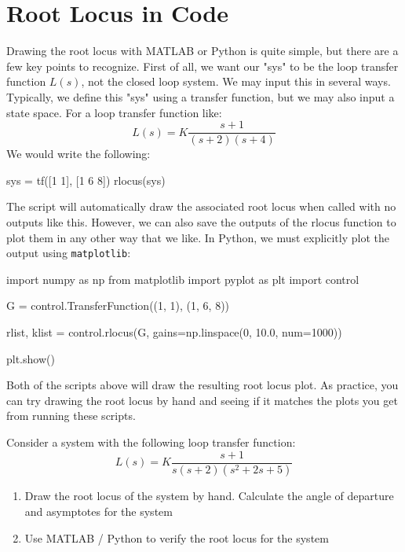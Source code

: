 
\section{Root Locus in Code}
Drawing the root locus with MATLAB or Python is quite simple, but there are a few key points to recognize. First of all, we want our "sys" to be the loop transfer function $L(s)$, not the closed loop system. We may input this in several ways. Typically, we define this "sys" using a transfer function, but we may also input a state space. For a loop transfer function like:
$$L(s)=K\frac{s+1}{(s+2)(s+4)}$$
We would write the following:
\begin{matlabscript}{}
sys = tf([1 1], [1 6 8])
rlocus(sys)
\end{matlabscript}

The script will automatically draw the associated root locus when called with no outputs like this. However, we can also save the outputs of the rlocus function to plot them in any other way that we like. In Python, we must explicitly plot the output using \texttt{matplotlib}:
\begin{pythonscript}{}
import numpy as np
from matplotlib import pyplot as plt 
import control

G = control.TransferFunction((1, 1), (1, 6, 8))

rlist, klist = control.rlocus(G, gains=np.linspace(0, 10.0, num=1000))

plt.show()
\end{pythonscript}
Both of the scripts above will draw the resulting root locus plot. As practice, you can try drawing the root locus by hand and seeing if it matches the plots you get from running these scripts.

\begin{exercise}
    Consider a system with the following loop transfer function:
    $$L(s)=K\frac{s+1}{s(s+2)(s^2+2s+5)}$$
    \begin{enumerate}[label=\alph*)]
        \item Draw the root locus of the system by hand. Calculate the angle of departure and asymptotes for the system
        \item Use MATLAB / Python to verify the root locus for the system
    \end{enumerate}
\end{exercise}

